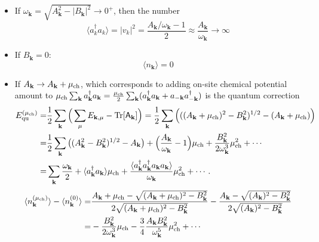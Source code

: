 \documentclass[aps, prx, nofootinbib, superscriptaddress]{revtex4-2}
\newcommand{\kvec}{\mathbf{k}}
\newcommand{\much}{\mu_{\rm ch}}
\newcommand{\Tr}{\mathrm{Tr}}
\begin{document}
\begin{itemize}
    \item If $\omega_{\kvec} = \sqrt{A^{2}_{\kvec} - |B_{\kvec}|^{2}} \rightarrow 0^{+}$, then the number 
    \begin{equation}
        \langle a_{k}^{\dagger} a_{k} \rangle = |v_k|^2 = \frac{A_{\kvec}/\omega_{\kvec} - 1}{2} \approx \frac{A_{\kvec}}{\omega_{\kvec}} \rightarrow \infty
    \end{equation}
    \item  If $B_{\kvec} = 0$:
    \begin{equation}
        \langle n_{\kvec} \rangle = 0
    \end{equation}
    \item If $A_{\kvec} \rightarrow A_{\kvec} + \much$, which corresponds to adding on-site chemical potential amount to $\much \sum_{\kvec} a_{\kvec}^{\dagger}a_{\kvec} = \frac{\much}{2} \sum_{\kvec} (a_{\kvec}^{\dagger}a_{\kvec} + a_{-\kvec}a^{\dagger}_{-\kvec} )$ is the quantum correction
    \begin{align*}
        E_{\rm qu}^{(\much)}
        = & \frac{1}{2} \sum_{\kvec} \Big( \sum_{\mu} E_{\kvec, \mu} - \Tr[\mathsf{A}_{\kvec}]\Big)
        = \frac{1}{2}\sum_{\kvec}  \Big(  ((A_{\kvec} + \much)^{2} - B_{\kvec}^{2})^{1/2} - (A_{\kvec} + \much) \Big) \\
        = & \frac{1}{2} \sum_{\kvec} \big( (A_{\kvec}^{2} - B_{\kvec}^{2})^{1/2} - A_{\kvec} \big)
        + \Big( \frac{A_{\kvec}}{\omega_{\kvec}} - 1\Big) \much
        + \frac{B_{\kvec}^{2}}{2\omega^{3}_{\kvec}} \much^{2} + \cdots  \\
        = & \sum_{\kvec} \frac{\omega_{\kvec}}{2} + \langle a_{\kvec}^{\dagger} a_{\kvec} \rangle \much +  \frac{\langle a_{\kvec}^{\dagger} a_{\kvec}^{\dagger} a_{\kvec} a_{\kvec} \rangle}{\omega_{\kvec}} \much^{2} + \cdots.
    \end{align*}
    \begin{align*}
        \langle n_{\kvec}^{(\much)} \rangle - \langle n_{\kvec}^{(0)} \rangle
        = & \frac{A_{\kvec} + \much - \sqrt{(A_{\kvec} + \much)^{2} - B_{\kvec}^{2}}}{2 \sqrt{(A_{\kvec} + \much)^{2} - B_{\kvec}^{2}} }
        - \frac{A_{\kvec} - \sqrt{(A_{\kvec})^{2} - B_{\kvec}^{2}}}{2 \sqrt{(A_{\kvec})^{2} - B_{\kvec}^{2}} } \\
        = & - \frac{B_{\kvec}^{2}}{2 \omega^{3}_{\kvec}} \much - \frac{3}{4} \frac{A_{\kvec}B_{\kvec}^{2}}{\omega_{\kvec}^{5}} \much^{2} + \cdots
    \end{align*}
\end{itemize}
\end{document}
